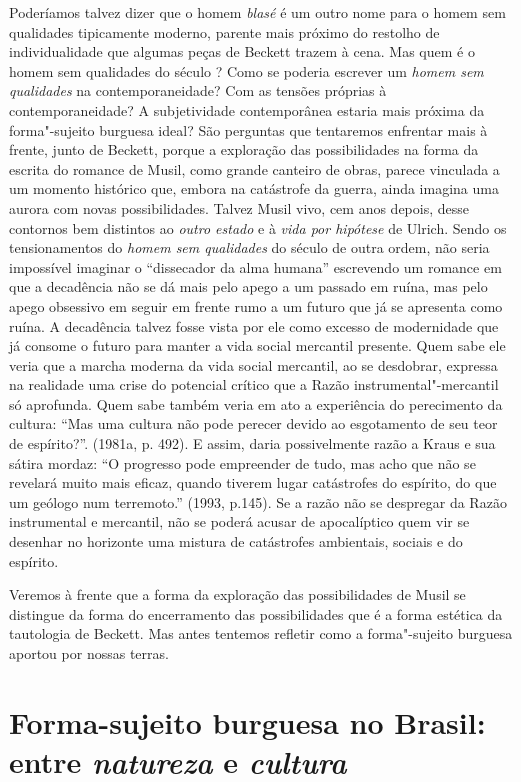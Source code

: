 Poderíamos talvez dizer que o homem \emph{blasé} é um outro nome para o
homem sem qualidades tipicamente moderno, parente mais próximo do
restolho de individualidade que algumas peças de Beckett trazem à cena.
Mas quem é o homem sem qualidades do século ? Como se poderia
escrever um \emph{homem sem qualidades} na contemporaneidade? Com as
tensões próprias à contemporaneidade? A subjetividade contemporânea
estaria mais próxima da forma"-sujeito burguesa ideal? São perguntas que
tentaremos enfrentar mais à frente, junto de Beckett, porque a
exploração das possibilidades na forma da escrita do romance de Musil,
como grande canteiro de obras, parece vinculada a um momento histórico
que, embora na catástrofe da guerra, ainda imagina uma aurora com novas
possibilidades. Talvez Musil vivo, cem anos depois, desse contornos bem
distintos ao \emph{outro estado} e à \emph{vida por hipótese} de Ulrich.
Sendo os tensionamentos do \emph{homem sem qualidades} do século  de
outra ordem, não seria impossível imaginar o ``dissecador da alma
humana'' escrevendo um romance em que a decadência não se dá mais pelo
apego a um passado em ruína, mas pelo apego obsessivo em seguir em
frente rumo a um futuro que já se apresenta como ruína. A decadência
talvez fosse vista por ele como excesso de modernidade que já consome o
futuro para manter a vida social mercantil presente. Quem sabe ele veria que a
marcha moderna da vida social mercantil, ao se desdobrar, expressa na
realidade uma crise do potencial crítico que a Razão
instrumental"-mercantil só aprofunda. Quem sabe também veria em ato a
experiência do perecimento da cultura: ``Mas uma cultura não pode
perecer devido ao esgotamento de seu teor de espírito?''. (1981a, p.
492). E assim, daria possivelmente razão a Kraus e sua sátira mordaz:
``O progresso pode empreender de tudo, mas acho que não se revelará
muito mais eficaz, quando tiverem lugar catástrofes do espírito, do que
um geólogo num terremoto.'' (1993, p.145). Se a razão não se despregar
da Razão instrumental e mercantil, não se poderá acusar de apocalíptico
quem vir se desenhar no horizonte uma mistura de catástrofes ambientais,
sociais e do espírito.

Veremos à frente que a forma da exploração das possibilidades de Musil se
distingue da forma do encerramento das possibilidades que é a forma
estética da tautologia de Beckett. Mas antes tentemos refletir como a
forma"-sujeito burguesa aportou por nossas terras.

\chapter*{Forma-sujeito burguesa no Brasil: entre \emph{natureza} e \emph{cultura}}


